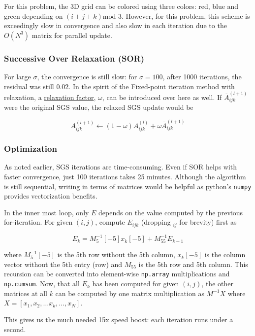 \documentclass[11pt,titlepage]{article}
\begin{document}
For this problem, the 3D grid can be colored using three colors: red, blue and green depending on $(i + j + k) \text{
mod }3$. However, for this problem, this scheme is exceedingly slow in convergence and also slow in each iteration due to the
$O(N^3)$ matrix for parallel update.

\subsubsection{Successive Over Relaxation (SOR)}
For large $\sigma$, the convergence is still slow: for $\sigma = 100$, after 1000 iterations, the residual was still
$0.02$. In the spirit of the Fixed-point iteration method with relaxation, a
\href{https://en.wikipedia.org/wiki/Successive_over-relaxation}{relaxation factor}, $\omega$, can be introduced over
here as well. If $\overline{A}_{ijk}^{(l + 1)}$ were the original SGS value, the relaxed SGS update would be

$$
A_{ijk}^{(l + 1)} \leftarrow  (1 - \omega) A_{ijk}^{(l)} + \omega \overline{A}_{ijk}^{(l + 1)}
$$

\newpage
\subsubsection{Optimization}
As noted earlier, SGS iterations are time-consuming. Even if SOR helps with faster convergence, just 100 iterations
takes 25 minutes. Although the algorithm is still sequential, writing in terms of matrices would be helpful as
python's \texttt{numpy} provides vectorization benefits.

In the inner most loop, only $E$ depends on the value computed by the previous for-iteration. For given $(i, j)$,
compute $E_{ijk}$ (dropping $_{ij}$ for brevity) first as

$$
E_{k} = M^{-1}_{5}[-5] x_{k}[-5] + M^{-1}_{55} E_{k-1}
$$

where $M^{-1}_{5}[-5]$ is the 5th row without the 5th column, $x_k[-5]$ is the column vector without the 5th entry (row)
and $M_{55}$ is the 5th row and 5th column. This recursion can be converted into element-wise \texttt{np.array}
multiplications and \texttt{np.cumsum}. Now, that all $E_k$ has been computed for given $(i, j)$, the other
matrices at all $k$ can be computed by one matrix multiplication as $M^{-1}X$ where $X = [x_1, x_2, \dots x_k, \dots, x_N]$.

This gives us the much needed 15x speed boost: each iteration runs under a second.
\end{document}
